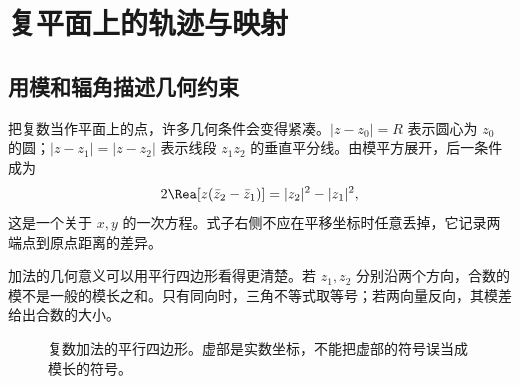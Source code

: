 \documentclass[11pt,openany,fontset=fandol]{ctexbook}
\theoremstyle{plain}\newtheorem{theorem}{定理}[chapter]\newtheorem{proposition}[theorem]{命题}
\theoremstyle{definition}\newtheorem{definition}{定义}[chapter]\newtheorem{example}{例}[chapter]
\theoremstyle{remark}\newtheorem*{remark}{说明}
\begin{document}
\section{复平面上的轨迹与映射}
\subsection{用模和辐角描述几何约束}
把复数当作平面上的点，许多几何条件会变得紧凑。$|z-z_0|=R$ 表示圆心为 $z_0$ 的圆；$|z-z_1|=|z-z_2|$ 表示线段 $z_1z_2$ 的垂直平分线。由模平方展开，后一条件成为
\[
2\Rea[z(\bar z_2-\bar z_1)]=|z_2|^2-|z_1|^2,
\]
这是一个关于 $x,y$ 的一次方程。式子右侧不应在平移坐标时任意丢掉，它记录两端点到原点距离的差异。

加法的几何意义可以用平行四边形看得更清楚。若 $z_1,z_2$ 分别沿两个方向，合数的模不是一般的模长之和。只有同向时，三角不等式取等号；若两向量反向，其模差给出合数的大小。
\begin{figure}[htbp]\centering
{}
\caption{复数加法的平行四边形。虚部是实数坐标，不能把虚部的符号误当成模长的符号。}
\label{fig:orig-011}
\end{figure}
\end{document}
